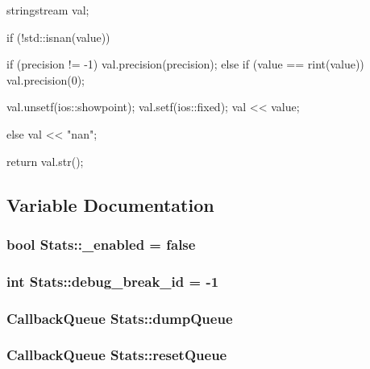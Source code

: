 \begin{DoxyCode}
{
    stringstream val;

    if (!std::isnan(value)) {
        if (precision != -1)
            val.precision(precision);
        else if (value == rint(value))
            val.precision(0);

        val.unsetf(ios::showpoint);
        val.setf(ios::fixed);
        val << value;
    } else {
        val << "nan";
    }

    return val.str();
}
\end{DoxyCode}


\subsection{Variable Documentation}
\hypertarget{namespaceStats_ae793c31e3372c51a4996ce57cc219a54}{
\subsubsection[{\_\-enabled}]{\setlength{\rightskip}{0pt plus 5cm}bool {\bf Stats::\_\-enabled} = false}}
\label{namespaceStats_ae793c31e3372c51a4996ce57cc219a54}
\hypertarget{namespaceStats_abacf74f0010f42902b864f51751d05c9}{
\subsubsection[{debug\_\-break\_\-id}]{\setlength{\rightskip}{0pt plus 5cm}int {\bf Stats::debug\_\-break\_\-id} = -\/1}}
\label{namespaceStats_abacf74f0010f42902b864f51751d05c9}
\hypertarget{namespaceStats_a84952ecad0a9644e0ea9526b3736c8b7}{
\subsubsection[{dumpQueue}]{\setlength{\rightskip}{0pt plus 5cm}CallbackQueue {\bf Stats::dumpQueue}}}
\label{namespaceStats_a84952ecad0a9644e0ea9526b3736c8b7}
\hypertarget{namespaceStats_a052117624dd534c773035ba2e03f4474}{
\subsubsection[{resetQueue}]{\setlength{\rightskip}{0pt plus 5cm}CallbackQueue {\bf Stats::resetQueue}}}
\label{namespaceStats_a052117624dd534c773035ba2e03f4474}
